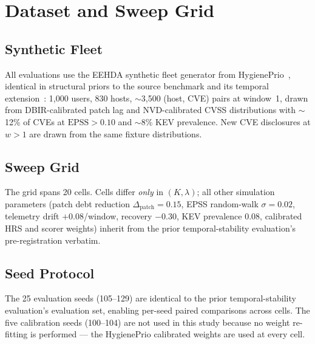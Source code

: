 \section{Dataset and Sweep Grid}

\subsection{Synthetic Fleet}

All evaluations use the EEHDA synthetic fleet generator from
HygienePrio~\cite{paper4hygieneprio}, identical in structural priors to
the source benchmark and its temporal extension~\cite{paper4hygieneprio,paper5temporal}: 1{,}000 users, 830 hosts, $\sim$3{,}500 (host, CVE) pairs
at window~1, drawn from DBIR-calibrated patch lag and NVD-calibrated CVSS
distributions with $\sim$12\% of CVEs at $\mathrm{EPSS} > 0.10$ and $\sim$8\%
KEV prevalence. New CVE disclosures at $w > 1$ are drawn from the same
fixture distributions.

\subsection{Sweep Grid}



The grid spans 20 cells. Cells differ \textit{only} in $(K, \lambda)$;
all other simulation parameters (patch debt reduction $\Delta_{\mathrm{patch}} =
0.15$, EPSS random-walk $\sigma = 0.02$, telemetry drift $+0.08$/window,
recovery $-0.30$, KEV prevalence $0.08$, calibrated HRS and scorer
weights) inherit from the prior temporal-stability evaluation's pre-registration verbatim.

\subsection{Seed Protocol}

The 25 evaluation seeds (105--129) are identical to the prior temporal-stability evaluation's evaluation
set, enabling per-seed paired comparisons across cells. The five
calibration seeds (100--104) are not used in this study because no
weight re-fitting is performed --- the HygienePrio calibrated weights are
used at every cell.
